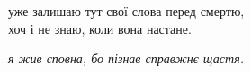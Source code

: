 уже залишаю тут свої слова перед смертю,\\
хоч і не знаю, коли вона настане.

\emph{я жив сповна, бо пізнав справжнє щастя.}
